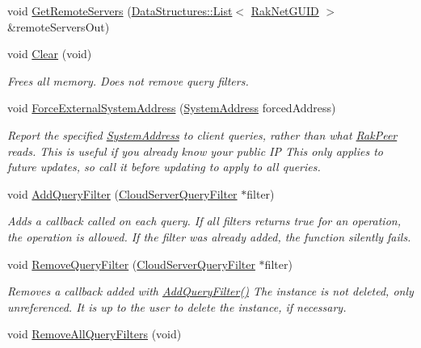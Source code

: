 \begin{DoxyCompactItemize}
void \hyperlink{class_rak_net_1_1_cloud_server_a6d15b8c8b6d69d499ac4e7576f5ff3ae}{Get\-Remote\-Servers} (\hyperlink{class_data_structures_1_1_list}{Data\-Structures\-::\-List}$<$ \hyperlink{struct_rak_net_1_1_rak_net_g_u_i_d}{Rak\-Net\-G\-U\-I\-D} $>$ \&remote\-Servers\-Out)
\item 
\hypertarget{class_rak_net_1_1_cloud_server_a038d04e0991f06463841f3df395cc2ae}{void \hyperlink{class_rak_net_1_1_cloud_server_a038d04e0991f06463841f3df395cc2ae}{Clear} (void)}\label{class_rak_net_1_1_cloud_server_a038d04e0991f06463841f3df395cc2ae}

\begin{DoxyCompactList}\small\item\em Frees all memory. Does not remove query filters. \end{DoxyCompactList}\item 
void \hyperlink{class_rak_net_1_1_cloud_server_ad8d675ec8b8e9f7b5318945a2591ddb9}{Force\-External\-System\-Address} (\hyperlink{struct_rak_net_1_1_system_address}{System\-Address} forced\-Address)
\begin{DoxyCompactList}\small\item\em Report the specified \hyperlink{struct_rak_net_1_1_system_address}{System\-Address} to client queries, rather than what \hyperlink{class_rak_net_1_1_rak_peer}{Rak\-Peer} reads. This is useful if you already know your public I\-P This only applies to future updates, so call it before updating to apply to all queries. \end{DoxyCompactList}\item 
void \hyperlink{class_rak_net_1_1_cloud_server_a992b7c2f60266c4743b7d872068837a8}{Add\-Query\-Filter} (\hyperlink{class_rak_net_1_1_cloud_server_query_filter}{Cloud\-Server\-Query\-Filter} $\ast$filter)
\begin{DoxyCompactList}\small\item\em Adds a callback called on each query. If all filters returns true for an operation, the operation is allowed. If the filter was already added, the function silently fails. \end{DoxyCompactList}\item 
void \hyperlink{class_rak_net_1_1_cloud_server_ace228ddfce4afc1d1eb42204fa5fec1c}{Remove\-Query\-Filter} (\hyperlink{class_rak_net_1_1_cloud_server_query_filter}{Cloud\-Server\-Query\-Filter} $\ast$filter)
\begin{DoxyCompactList}\small\item\em Removes a callback added with \hyperlink{class_rak_net_1_1_cloud_server_a992b7c2f60266c4743b7d872068837a8}{Add\-Query\-Filter()} The instance is not deleted, only unreferenced. It is up to the user to delete the instance, if necessary. \end{DoxyCompactList}\item 
\hypertarget{class_rak_net_1_1_cloud_server_a09edfffb4c018b19b71e032e5a570c2c}{void \hyperlink{class_rak_net_1_1_cloud_server_a09edfffb4c018b19b71e032e5a570c2c}{Remove\-All\-Query\-Filters} (void)}\label{class_rak_net_1_1_cloud_server_a09edfffb4c018b19b71e032e5a570c2c}


\end{DoxyCompactItemize}
